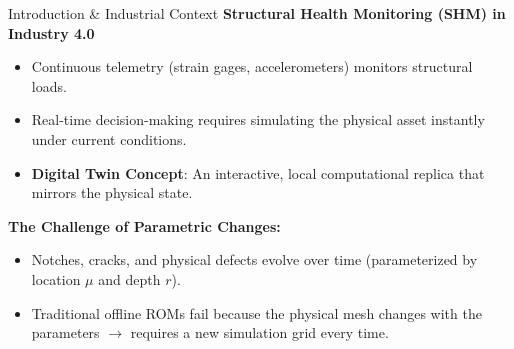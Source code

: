 \documentclass[aspectratio=169, 10pt]{beamer}
\begin{document}
\begin{frame}{Introduction \& Industrial Context}
    \textbf{Structural Health Monitoring (SHM) in Industry 4.0}
    \begin{itemize}
        \item Continuous telemetry (strain gages, accelerometers) monitors structural loads.
        \item Real-time decision-making requires simulating the physical asset instantly under current conditions.
        \item \textbf{Digital Twin Concept}: An interactive, local computational replica that mirrors the physical state.
    \end{itemize}
    \vspace{0.3cm}
    \textbf{The Challenge of Parametric Changes:}
    \begin{itemize}
        \item Notches, cracks, and physical defects evolve over time (parameterized by location $\mu$ and depth $r$).
        \item Traditional offline ROMs fail because the physical mesh changes with the parameters $\to$ requires a new simulation grid every time.
    \end{itemize}
\end{frame}
\end{document}
